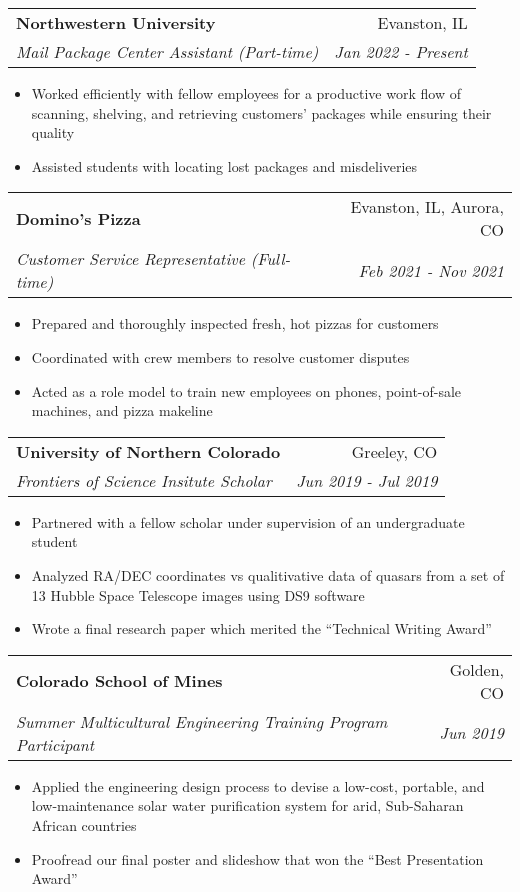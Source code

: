 \documentclass[letterpaper,20pt]{article}
\makeatletter
\newcommand{\resumeItemWithoutTitle}[1]{

  \item{
  }
  \vspace{-5pt}
}
\newcommand{\resumeSubheading}[4]{
  
  \vspace{2pt}
    \begin{tabular*}{0.97\textwidth}{l@{\extracolsep{\fill}}r}
      \textbf{#1} & #2 \\
      \textit{#3} & \textit{#4} \\
    \end{tabular*}\vspace{5pt}
}
\newcommand{\resumeItemListStart}{\begin{itemize}\vspace{-5pt}}
\newcommand{\resumeItemListEnd}{\end{itemize}}
\makeatother
\begin{document}
    \resumeSubheading{Northwestern University}{Evanston, IL}
    {Mail Package Center Assistant (Part-time)}{Jan 2022 - Present}
    \resumeItemListStart

        \resumeItemWithoutTitle{}
        {Worked efficiently with fellow employees for a productive work flow of scanning, shelving, and retrieving customers’ packages while ensuring their quality}
        \resumeItemWithoutTitle{}
        {Assisted students with locating lost packages and misdeliveries}
  
    \resumeItemListEnd
\vspace{-5pt}
    \resumeSubheading
		{Domino's Pizza}{Evanston, IL, Aurora, CO}
		{Customer Service Representative (Full-time)}{Feb 2021 - Nov 2021}
		\resumeItemListStart

        \resumeItemWithoutTitle{}
          {Prepared and thoroughly inspected fresh, hot pizzas for customers}
        \resumeItemWithoutTitle{}
          {Coordinated with crew members to resolve customer disputes}
        \resumeItemWithoutTitle{}
        {Acted as a role model to train new employees on phones, point-of-sale machines, and pizza makeline}

		\resumeItemListEnd

\vspace{-5pt}
    \resumeSubheading
		{University of Northern Colorado}{Greeley, CO}
		{Frontiers of Science Insitute Scholar}{Jun 2019 - Jul 2019}
		\resumeItemListStart
        \resumeItemWithoutTitle{}
          {Partnered with a fellow scholar under supervision of an undergraduate student}
        \resumeItemWithoutTitle{}
          {Analyzed RA/DEC coordinates vs qualitivative data of quasars from a set of 13 Hubble Space Telescope images using DS9 software}
        \resumeItemWithoutTitle{}
        {Wrote a final research paper which merited the ``Technical Writing Award''}
		\resumeItemListEnd


\vspace{-5pt}
    \resumeSubheading
		{Colorado School of Mines}{Golden, CO}
		{Summer Multicultural Engineering Training Program Participant}{Jun 2019}
		\resumeItemListStart
        \resumeItemWithoutTitle{}
          {Applied the engineering design process to devise a low-cost, portable, and low-maintenance solar water purification system for arid, Sub-Saharan African countries}
        \resumeItemWithoutTitle{}
        {Proofread our final poster and slideshow that won the ``Best Presentation Award''}
		\resumeItemListEnd
\end{document}
